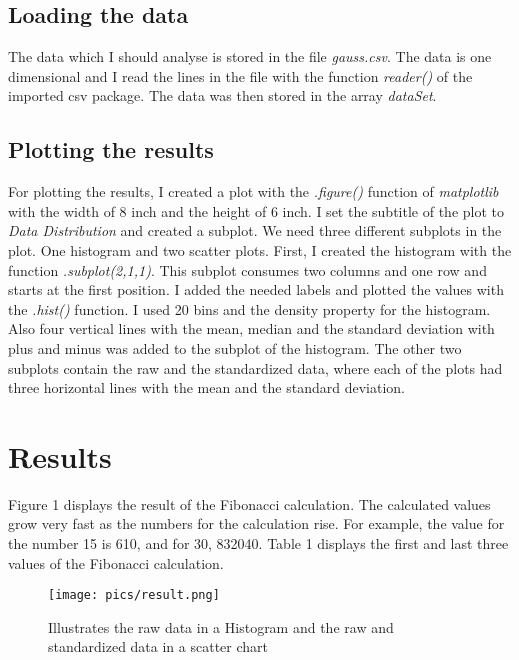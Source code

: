 \documentclass[10pt, a4paper, twocolumn]{article} %
\begin{document}
\subsection{Loading the data}
The data which I should analyse is stored in the file \textit{gauss.csv}. The data is one dimensional and I read the lines in the file with the function \textit{reader()} of the imported csv package. The data was then stored in the array \textit{dataSet}. 



\subsection{Plotting the results}
For plotting the results, I created a plot with the \textit{.figure()} function of \textit{matplotlib} with the width of 8 inch and the height of 6 inch. I set the subtitle of the plot to \textit{Data Distribution} and created a subplot. We need three different subplots in the plot. One histogram and two scatter plots. 
First, I created the histogram with the function  \textit{.subplot(2,1,1)}. This subplot consumes two columns and one row and starts at the first position. I added the needed labels and plotted the values with the \textit{.hist()} function. I used 20 bins and the density property for the histogram. Also four vertical lines with the mean, median and the standard deviation with plus and minus was added to the subplot of the histogram. 
The other two subplots contain the raw and the standardized data, where each of the plots had three horizontal lines with the mean and the standard deviation. 

\section{Results}
Figure 1 displays the result of the Fibonacci calculation. The calculated values grow very fast as the numbers for the calculation rise. For example, the value for the number 15 is 610, and for 30, 832040. Table 1 displays the first and last three values of the Fibonacci calculation.    

\begin{figure}[t] %
  \centering
  \texttt{[image: pics/result.png]}
  \caption{Illustrates the raw data in a Histogram and the raw and standardized data in a scatter chart}
  \label{fig:fibonacciPlot}
\end{figure}
\end{document}
